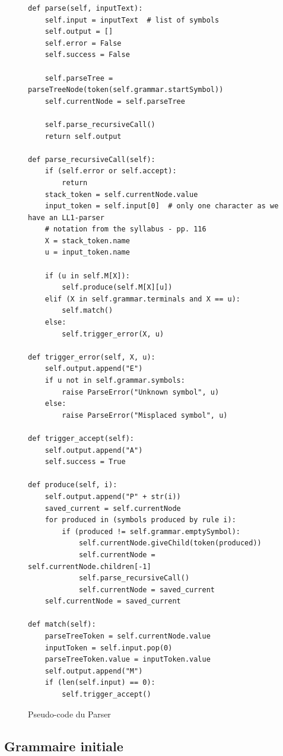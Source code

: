 \documentclass[a4paper,10pt]{article}
\begin{document}
\begin{figure}[H]
\begin{lstlisting}
def parse(self, inputText):
	self.input = inputText  # list of symbols
	self.output = []
	self.error = False
	self.success = False

	self.parseTree = parseTreeNode(token(self.grammar.startSymbol))
	self.currentNode = self.parseTree

	self.parse_recursiveCall()
	return self.output

def parse_recursiveCall(self):
	if (self.error or self.accept):
		return
	stack_token = self.currentNode.value
	input_token = self.input[0]  # only one character as we have an LL1-parser
	# notation from the syllabus - pp. 116
	X = stack_token.name
	u = input_token.name

	if (u in self.M[X]):
		self.produce(self.M[X][u])
	elif (X in self.grammar.terminals and X == u):
		self.match()
	else:
		self.trigger_error(X, u)

def trigger_error(self, X, u):
	self.output.append("E")
	if u not in self.grammar.symbols:
		raise ParseError("Unknown symbol", u)
	else:
		raise ParseError("Misplaced symbol", u)

def trigger_accept(self):
	self.output.append("A")
	self.success = True

def produce(self, i):
	self.output.append("P" + str(i))
	saved_current = self.currentNode
	for produced in (symbols produced by rule i):
		if (produced != self.grammar.emptySymbol):
			self.currentNode.giveChild(token(produced))
			self.currentNode = self.currentNode.children[-1]
			self.parse_recursiveCall()
			self.currentNode = saved_current
	self.currentNode = saved_current

def match(self):
	parseTreeToken = self.currentNode.value
	inputToken = self.input.pop(0)
	parseTreeToken.value = inputToken.value
	self.output.append("M")
	if (len(self.input) == 0):
		self.trigger_accept()
\end{lstlisting}
\fontfamily{}
\caption{Pseudo-code du Parser}
\label{lst:parser}
\end{figure}

 
\subsection{Grammaire initiale}
\end{document}
